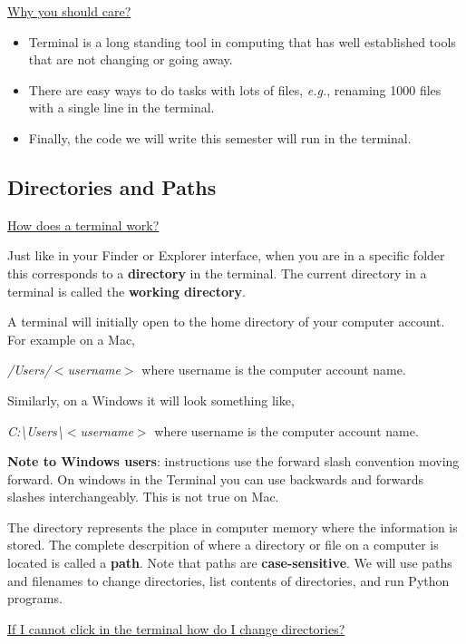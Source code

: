\documentclass[12pt]{article}
\begin{document}
\underline{Why you should care?}
\begin{itemize}
\item Terminal is a long standing tool in computing that has well established tools that are not changing or going away. 
\item There are easy ways to do tasks with lots of files, \textit{e.g.}, renaming 1000 files with a single line in the terminal.
\item Finally, the code we will write this semester will run in the terminal.
\end{itemize}


\subsection{Directories and Paths}
\underline{How does a terminal work?}

Just like in your Finder or Explorer interface, when you are in a specific folder this corresponds to a \textbf{directory} in the terminal.
The current directory in a terminal is called the \textbf{working directory}.

A terminal will initially open to the home directory of your computer account.
For example on a Mac,

\vspace{5mm}
\textit{/Users/$<$username$>$}
\vspace{5mm}
where username is the computer account name.

Similarly, on a Windows it will look something like,

\vspace{5mm}
\textit{C:\textbackslash Users\textbackslash $<$username$>$}
\vspace{5mm}
where username is the computer account name.

\textbf{Note to Windows users}: instructions use the forward slash convention moving forward. On windows in the Terminal you can use backwards and forwards slashes interchangeably. This is not true on Mac. 

The directory represents the place in computer memory where the information is stored.
The complete descrpition of where a directory or file on a computer is located is called a \textbf{path}.
Note that paths are \textbf{case-sensitive}. 
We will use paths and filenames to change directories, list contents of directories, and run Python programs. 

\underline{If I cannot click in the terminal how do I change directories?}
\end{document}
